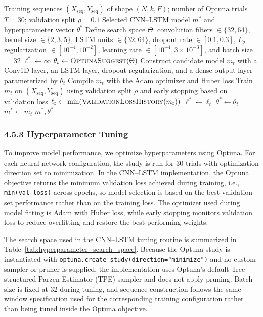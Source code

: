 \documentclass[pdflatex,sn-mathphys-num]{sn-jnl}%
\theoremstyle{thmstyleone}%
\theoremstyle{thmstyletwo}%
\theoremstyle{thmstylethree}%
\begin{document}
\begin{algorithm}[H]
\caption{CNN--LSTM Training and Hyperparameter Selection}
\label{alg:cnn_lstm_optuna}
\begin{algorithmic}[1]
\Require Training sequences $(X_{\text{seq}}, Y_{\text{seq}})$ of shape $(N,k,F)$; number of Optuna trials $T=30$; validation split $\rho=0.1$
\Ensure Selected CNN--LSTM model $m^{\ast}$ and hyperparameter vector $\theta^{\ast}$
\State Define search space $\Theta$: convolution filters $\in \{32,64\}$, kernel size $\in \{2,3,5\}$, LSTM units $\in \{32,64\}$, dropout rate $\in [0.1,0.3]$, $L_2$ regularization $\in [10^{-4},10^{-2}]$, learning rate $\in [10^{-4}, 3 \times 10^{-3}]$, and batch size $=32$
\State $\ell^{\ast} \gets \infty$
    \State $\theta_t \gets \textsc{OptunaSuggest}(\Theta)$
    \State Construct candidate model $m_t$ with a Conv1D layer, an LSTM layer, dropout regularization, and a dense output layer parameterized by $\theta_t$
    \State Compile $m_t$ with the Adam optimizer and Huber loss
    \State Train $m_t$ on $(X_{\text{seq}}, Y_{\text{seq}})$ using validation split $\rho$ and early stopping based on validation loss
    \State $\ell_t \gets \min(\textsc{ValidationLossHistory}(m_t))$
        \State $\ell^{\ast} \gets \ell_t$
        \State $\theta^{\ast} \gets \theta_t$
        \State $m^{\ast} \gets m_t$
    \EndIf
\EndFor
\State \Return $m^{\ast}, \theta^{\ast}$
\end{algorithmic}
\end{algorithm}

\subsubsection*{4.5.3 Hyperparameter Tuning}\label{subsubsec:hypertuning}

To improve model performance, we optimize hyperparameters using Optuna. For each neural-network configuration, the study is run for 30 trials with optimization direction set to minimization. In the CNN--LSTM implementation, the Optuna objective returns the minimum validation loss achieved during training, i.e., \texttt{min(val\_loss)} across epochs, so model selection is based on the best validation-set performance rather than on the training loss. The optimizer used during model fitting is Adam with Huber loss, while early stopping monitors validation loss to reduce overfitting and restore the best-performing weights.

The search space used in the CNN--LSTM tuning routine is summarized in Table~\ref{tab:hyperparameter_search_space}. Because the Optuna study is instantiated with \texttt{optuna.create\_study(direction="minimize")} and no custom sampler or pruner is supplied, the implementation uses Optuna's default Tree-structured Parzen Estimator (TPE) sampler and does not apply pruning. Batch size is fixed at 32 during tuning, and sequence construction follows the same window specification used for the corresponding training configuration rather than being tuned inside the Optuna objective.
\end{document}
